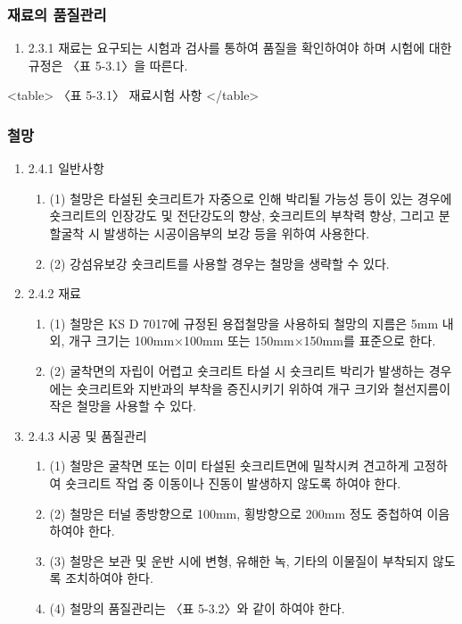 \documentclass[12pt,a4paper]{article}
\begin{document}
\subsubsection{재료의 품질관리}
\begin{enumerate}
\item  2.3.1 재료는 요구되는 시험과 검사를 통하여 품질을 확인하여야 하며 시험에 대한 규정은 〈표 5-3.1〉을 따른다.  
\end{enumerate}

<table>
〈표 5-3.1〉 재료시험 사항
</table>

\subsubsection{철망}
\begin{enumerate}
\item 2.4.1 일반사항  
\begin{enumerate}
\item (1) 철망은 타설된 숏크리트가 자중으로 인해 박리될 가능성 등이 있는 경우에 숏크리트의 인장강도 및 전단강도의 향상, 숏크리트의 부착력 향상, 그리고 분할굴착 시 발생하는 시공이음부의 보강 등을 위하여 사용한다. 
\item (2) 강섬유보강 숏크리트를 사용할 경우는 철망을 생략할 수 있다. 
\end{enumerate}
\item 2.4.2 재료  
\begin{enumerate}
\item (1) 철망은 KS D 7017에 규정된 용접철망을 사용하되 철망의 지름은 5mm 내외, 개구 크기는 100mm×100mm 또는 150mm×150mm를 표준으로 한다.  
\item (2) 굴착면의 자립이 어렵고 숏크리트 타설 시 숏크리트 박리가 발생하는 경우에는 숏크리트와 지반과의 부착을 증진시키기 위하여 개구 크기와 철선지름이 작은 철망을 사용할 수 있다. 
\end{enumerate}
\item 2.4.3 시공 및 품질관리  
	\begin{enumerate}
	\item (1) 철망은 굴착면 또는 이미 타설된 숏크리트면에 밀착시켜 견고하게 고정하여 숏크리트 작업 중 이동이나 진동이 발생하지 않도록 하여야 한다. 
	\item (2) 철망은 터널 종방향으로 100mm, 횡방향으로 200mm 정도 중첩하여 이음하여야 한다. 
	\item (3) 철망은 보관 및 운반 시에 변형, 유해한 녹, 기타의 이물질이 부착되지 않도록 조치하여야 한다. 
	\item (4) 철망의 품질관리는 〈표 5-3.2〉와 같이 하여야 한다. 
	\end{enumerate}
\end{enumerate}
 
\end{document}
